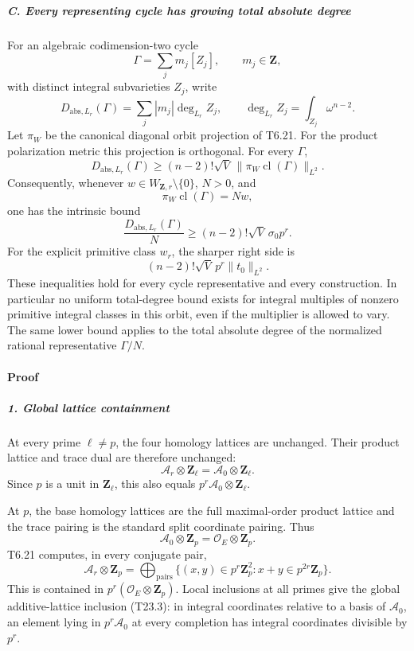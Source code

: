 \documentclass[11pt,a4paper]{article}
\theoremstyle{definition}
\begin{document}
\subparagraph{C. Every representing cycle has growing total absolute degree}\label{c.-every-representing-cycle-has-growing-total-absolute-degree}

For an algebraic codimension-two cycle \[
 \Gamma=\sum_j m_j[Z_j],\qquad m_j\in\mathbf Z,
\] with distinct integral subvarieties \(Z_j\), write \[
 D_{\mathrm{abs},L_r}(\Gamma)
       =\sum_j |m_j|\deg_{L_r}Z_j,
 \qquad
 \deg_{L_r}Z_j=\int_{Z_j}\omega^{n-2}.
 \tag{T23.7}
\] Let \(\pi_W\) be the canonical diagonal orbit projection of T6.21. For the product polarization metric this projection is orthogonal. For every \(\Gamma\), \[
 D_{\mathrm{abs},L_r}(\Gamma)
       \ge (n-2)!\sqrt V\,
                    \|\pi_W\operatorname{cl}(\Gamma)\|_{L^2}.
 \tag{T23.8}
\] Consequently, whenever \(w\in W_{\mathbf Z,r}\setminus\{0\}\), \(N>0\), and \[
 \pi_W\operatorname{cl}(\Gamma)=Nw,
\] one has the intrinsic bound \[
 \frac{D_{\mathrm{abs},L_r}(\Gamma)}{N}
       \ge (n-2)!\sqrt V\,\sigma_0p^r.
 \tag{T23.9}
\] For the explicit primitive class \(w_r\), the sharper right side is \[
 (n-2)!\sqrt V\,p^r\|t_0\|_{L^2}.
 \tag{T23.10}
\] These inequalities hold for every cycle representative and every construction. In particular no uniform total-degree bound exists for integral multiples of nonzero primitive integral classes in this orbit, even if the multiplier is allowed to vary. The same lower bound applies to the total absolute degree of the normalized rational representative \(\Gamma/N\).

\paragraph{Proof}\label{proof-4}

\subparagraph{1. Global lattice containment}\label{global-lattice-containment}

At every prime \(\ell\ne p\), the four homology lattices are unchanged. Their product lattice and trace dual are therefore unchanged: \[
 \mathcal A_r\otimes\mathbf Z_\ell
       =\mathcal A_0\otimes\mathbf Z_\ell.
\] Since \(p\) is a unit in \(\mathbf Z_\ell\), this also equals \(p^r\mathcal A_0\otimes\mathbf Z_\ell\).

At \(p\), the base homology lattices are the full maximal-order product lattice and the trace pairing is the standard split coordinate pairing. Thus \[
 \mathcal A_0\otimes\mathbf Z_p
       =\mathcal O_E\otimes\mathbf Z_p.
\] T6.21 computes, in every conjugate pair, \[
 \mathcal A_r\otimes\mathbf Z_p
 =\bigoplus_{\text{pairs}}
   \{(x,y)\in p^r\mathbf Z_p^2:x+y\in p^{2r}\mathbf Z_p\}.
 \tag{T23.11}
\] This is contained in \(p^r(\mathcal O_E\otimes\mathbf Z_p)\). Local inclusions at all primes give the global additive-lattice inclusion (T23.3): in integral coordinates relative to a basis of \(\mathcal A_0\), an element lying in \(p^r\mathcal A_0\) at every completion has integral coordinates divisible by \(p^r\).
\end{document}
